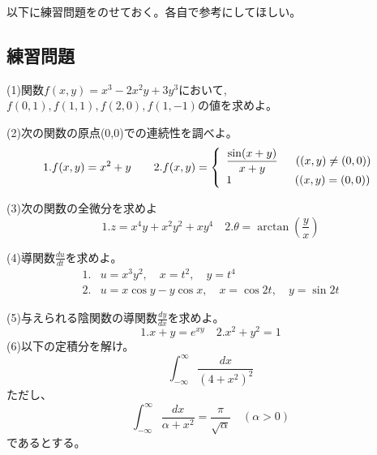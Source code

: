 \documentclass[a4j,dvipdfmx]{jsarticle}
\begin{document}
以下に練習問題をのせておく。各自で参考にしてほしい。

\subsection{練習問題}
(1)関数$f(x,y)=x^3-2x^2y+3y^3$において,$f(0,1),f(1,1),f(2,0),f(1,-1)$の値を求めよ。

(2)次の関数の原点(0,0)での連続性を調べよ。
\begin{equation*}
    1.f(x,y)=x^2+y\qquad 
    2.f(x,y)=\left \{
        \begin{array}{l}
        \displaystyle\frac{\sin(x+y)}{x+y} \hspace{2mm}\quad((x,y)\neq(0,0))\\
        1   \qquad\qquad\quad\hspace{2mm}((x,y)=(0,0))
        \end{array}
        \right.
\end{equation*}

(3)次の関数の全微分を求めよ
\begin{equation*}
    1.z=x^4y+x^2y^2+xy^4\quad 2.\theta=\arctan(\frac{y}{x})
\end{equation*}

(4)導関数$\displaystyle\frac{du}{dt}$を求めよ。
\begin{align*}
    1.&u=x^3y^2,\quad x=t^2,\quad y=t^4\\
    2.&u=x\cos y-y\cos x,\quad x=\cos 2t,\quad y=\sin2t
\end{align*}

(5)与えられる陰関数の導関数$\displaystyle\frac{dy}{dx}$を求めよ。
\begin{equation*}
    1.x+y=e^{xy}\quad 2.x^2+y^2=1
\end{equation*}
(6)以下の定積分を解け。
\begin{equation*}
    \int_{-\infty}^{\infty}\frac{dx}{(4+x^2)^2}
\end{equation*}
ただし、
\begin{equation*}
    \int_{-\infty}^{\infty}\frac{dx}{\alpha+x^2}=\frac{\pi}{\sqrt{\alpha}}\quad(\alpha>0)
\end{equation*}
であるとする。
\end{document}

